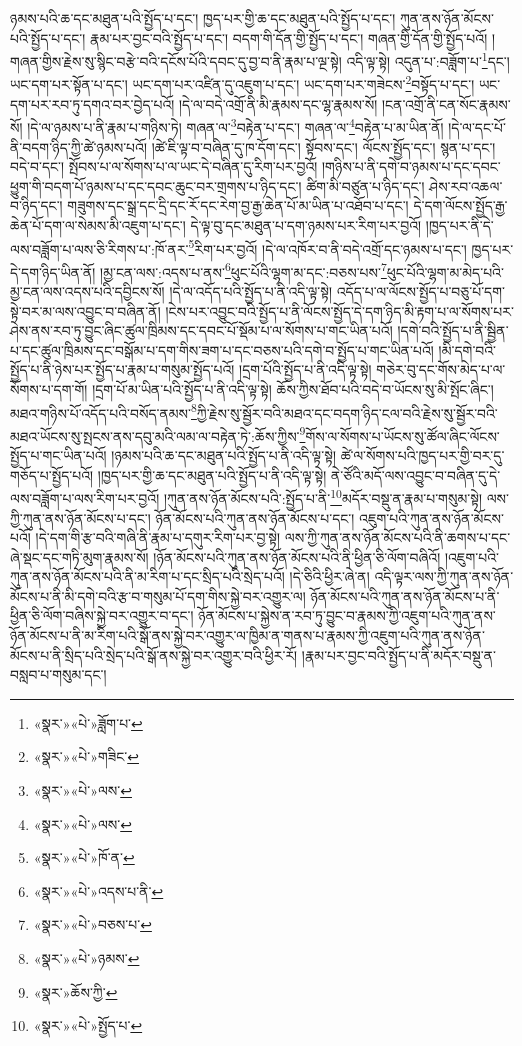 ཉམས་པའི་ཆ་དང་མཐུན་པའི་སྤྱོད་པ་དང་། ཁྱད་པར་གྱི་ཆ་དང་མཐུན་པའི་སྤྱོད་པ་དང་། ཀུན་ནས་ཉོན་མོངས་པའི་སྤྱོད་པ་དང་། རྣམ་པར་བྱང་བའི་སྤྱོད་པ་དང་། བདག་གི་དོན་གྱི་སྤྱོད་པ་དང་། གཞན་གྱི་དོན་གྱི་སྤྱོད་པའོ། །གཞན་གྱིས་རྗེས་སུ་སྙིང་བརྩེ་བའི་དངོས་པོའི་དབང་དུ་བྱ་བ་ནི་རྣམ་པ་ལྔ་སྟེ། འདི་ལྟ་སྟེ། འདུན་པ་:བཟློག་པ་\footnote{«སྣར་»«པེ་»ཟློག་པ་}དང་། ཡང་དག་པར་སྟོན་པ་དང་། ཡང་དག་པར་འཛིན་དུ་འཇུག་པ་དང་། ཡང་དག་པར་གཟེངས་\footnote{«སྣར་»«པེ་»གཟིང་}བསྟོད་པ་དང་། ཡང་དག་པར་རབ་ཏུ་དགའ་བར་བྱེད་པའོ། །དེ་ལ་བདེ་འགྲོ་ནི་མི་རྣམས་དང་ལྷ་རྣམས་སོ། །ངན་འགྲོ་ནི་ངན་སོང་རྣམས་སོ། །དེ་ལ་ཉམས་པ་ནི་རྣམ་པ་གཉིས་ཏེ། གཞན་ལ་\footnote{«སྣར་»«པེ་»ལས་}བརྟེན་པ་དང་། གཞན་ལ་\footnote{«སྣར་»«པེ་»ལས་}བརྟེན་པ་མ་ཡིན་ནོ། །དེ་ལ་དང་པོ་ནི་བདག་ཉིད་ཀྱི་ཚེ་ཉམས་པའོ། །ཚེ་ཇི་ལྟ་བ་བཞིན་དུ་ཁ་དོག་དང་། སྟོབས་དང་། ལོངས་སྤྱོད་དང་། སྙན་པ་དང་། བདེ་བ་དང་། སྤོབས་པ་ལ་སོགས་པ་ལ་ཡང་དེ་བཞིན་དུ་རིག་པར་བྱའོ། །གཉིས་པ་ནི་དགེ་བ་ཉམས་པ་དང་དབང་ཕྱུག་གི་བདག་པོ་ཉམས་པ་དང་དབང་ཆུང་བར་གྲགས་པ་ཉིད་དང་། ཚིག་མི་བཙུན་པ་ཉིད་དང་། ཤེས་རབ་འཆལ་བ་ཉིད་དང་། གཟུགས་དང་སྒྲ་དང་དྲི་དང་རོ་དང་རེག་བྱ་རྒྱ་ཆེན་པོ་མ་ཡིན་པ་འཐོབ་པ་དང་། དེ་དག་ལོངས་སྤྱོད་རྒྱ་ཆེན་པོ་དག་ལ་སེམས་མི་འཇུག་པ་དང་། དེ་ལྟ་བུ་དང་མཐུན་པ་དག་ཉམས་པར་རིག་པར་བྱའོ། །ཁྱད་པར་ནི་དེ་ལས་བཟློག་པ་ལས་ཅི་རིགས་པ་:ཁོ་ནར་\footnote{«སྣར་»«པེ་»ཁོ་ན་}རིག་པར་བྱའོ། །དེ་ལ་འཁོར་བ་ནི་བདེ་འགྲོ་དང་ཉམས་པ་དང་། ཁྱད་པར་དེ་དག་ཉིད་ཡིན་ནོ། །མྱ་ངན་ལས་:འདས་པ་ནས་\footnote{«སྣར་»«པེ་»འདས་པ་ནི་}ཕུང་པོའི་ལྷག་མ་དང་:བཅས་པས་\footnote{«སྣར་»«པེ་»བཅས་པ་}ཕུང་པོའི་ལྷག་མ་མེད་པའི་མྱ་ངན་ལས་འདས་པའི་དབྱིངས་སོ། །དེ་ལ་འདོད་པའི་སྤྱོད་པ་ནི་འདི་ལྟ་སྟེ། འདོད་པ་ལ་ལོངས་སྤྱོད་པ་བཅུ་པོ་དག་སྟེ་བར་མ་ལས་འབྱུང་བ་བཞིན་ནོ། །ངེས་པར་འབྱུང་བའི་སྤྱོད་པ་ནི་ལོངས་སྤྱོད་དེ་དག་ཉིད་མི་རྟག་པ་ལ་སོགས་པར་ཤེས་ནས་རབ་ཏུ་བྱུང་ཞིང་ཚུལ་ཁྲིམས་དང་དབང་པོ་སྡོམ་པ་ལ་སོགས་པ་གང་ཡིན་པའོ། །དགེ་བའི་སྤྱོད་པ་ནི་སྦྱིན་པ་དང་ཚུལ་ཁྲིམས་དང་བསྒོམ་པ་དག་གིས་ཟག་པ་དང་བཅས་པའི་དགེ་བ་སྤྱོད་པ་གང་ཡིན་པའོ། །མི་དགེ་བའི་སྤྱོད་པ་ནི་ཉེས་པར་སྤྱོད་པ་རྣམ་པ་གསུམ་སྤྱོད་པའོ། །དྲག་པོའི་སྤྱོད་པ་ནི་འདི་ལྟ་སྟེ། གཅེར་བུ་དང་གོས་མེད་པ་ལ་སོགས་པ་དག་གོ། །དྲག་པོ་མ་ཡིན་པའི་སྤྱོད་པ་ནི་འདི་ལྟ་སྟེ། ཆོས་ཀྱིས་ཐོབ་པའི་བདེ་བ་ཡོངས་སུ་མི་སྤོང་ཞིང་། མཐའ་གཉིས་པོ་འདོད་པའི་བསོད་ནམས་\footnote{«སྣར་»«པེ་»ཉམས་}ཀྱི་རྗེས་སུ་སྦྱོར་བའི་མཐའ་དང་བདག་ཉིད་ངལ་བའི་རྗེས་སུ་སྦྱོར་བའི་མཐའ་ཡོངས་སུ་སྤངས་ནས་དབུ་མའི་ལམ་ལ་བརྟེན་ཏེ་:ཆོས་ཀྱིས་\footnote{«སྣར་»ཆོས་ཀྱི་}གོས་ལ་སོགས་པ་ཡོངས་སུ་ཚོལ་ཞིང་ལོངས་སྤྱོད་པ་གང་ཡིན་པའོ། །ཉམས་པའི་ཆ་དང་མཐུན་པའི་སྤྱོད་པ་ནི་འདི་ལྟ་སྟེ། ཚེ་ལ་སོགས་པའི་ཁྱད་པར་གྱི་བར་དུ་གཅོད་པ་སྤྱོད་པའོ། །ཁྱད་པར་གྱི་ཆ་དང་མཐུན་པའི་སྤྱོད་པ་ནི་འདི་ལྟ་སྟེ། ནེ་ཙོའི་མདོ་ལས་འབྱུང་བ་བཞིན་དུ་དེ་ལས་བཟློག་པ་ལས་རིག་པར་བྱའོ། །ཀུན་ནས་ཉོན་མོངས་པའི་:སྤྱོད་པ་ནི་\footnote{«སྣར་»«པེ་»སྤྱོད་པ་}མདོར་བསྡུ་ན་རྣམ་པ་གསུམ་སྟེ། ལས་ཀྱི་ཀུན་ནས་ཉོན་མོངས་པ་དང་། ཉོན་མོངས་པའི་ཀུན་ནས་ཉོན་མོངས་པ་དང་། འཇུག་པའི་ཀུན་ནས་ཉོན་མོངས་པའོ། །དེ་དག་གི་རྩ་བའི་གཞི་ནི་རྣམ་པ་དགུར་རིག་པར་བྱ་སྟེ། ལས་ཀྱི་ཀུན་ནས་ཉོན་མོངས་པའི་ནི་ཆགས་པ་དང་ཞེ་སྡང་དང་གཏི་མུག་རྣམས་སོ། །ཉོན་མོངས་པའི་ཀུན་ནས་ཉོན་མོངས་པའི་ནི་ཕྱིན་ཅི་ལོག་བཞིའོ། །འཇུག་པའི་ཀུན་ནས་ཉོན་མོངས་པའི་ནི་མ་རིག་པ་དང་སྲིད་པའི་སྲེད་པའོ། །དེ་ཅིའི་ཕྱིར་ཞེ་ན། འདི་ལྟར་ལས་ཀྱི་ཀུན་ནས་ཉོན་མོངས་པ་ནི་མི་དགེ་བའི་རྩ་བ་གསུམ་པོ་དག་གིས་སྐྱེ་བར་འགྱུར་ལ། ཉོན་མོངས་པའི་ཀུན་ནས་ཉོན་མོངས་པ་ནི་ཕྱིན་ཅི་ལོག་བཞིས་སྐྱེ་བར་འགྱུར་བ་དང་། ཉོན་མོངས་པ་སྐྱེས་ན་རབ་ཏུ་བྱུང་བ་རྣམས་ཀྱི་འཇུག་པའི་ཀུན་ནས་ཉོན་མོངས་པ་ནི་མ་རིག་པའི་སྒོ་ནས་སྐྱེ་བར་འགྱུར་ལ་ཁྱིམ་ན་གནས་པ་རྣམས་ཀྱི་འཇུག་པའི་ཀུན་ནས་ཉོན་མོངས་པ་ནི་སྲིད་པའི་སྲེད་པའི་སྒོ་ནས་སྐྱེ་བར་འགྱུར་བའི་ཕྱིར་རོ། །རྣམ་པར་བྱང་བའི་སྤྱོད་པ་ནི་མདོར་བསྡུ་ན་བསླབ་པ་གསུམ་དང་། 